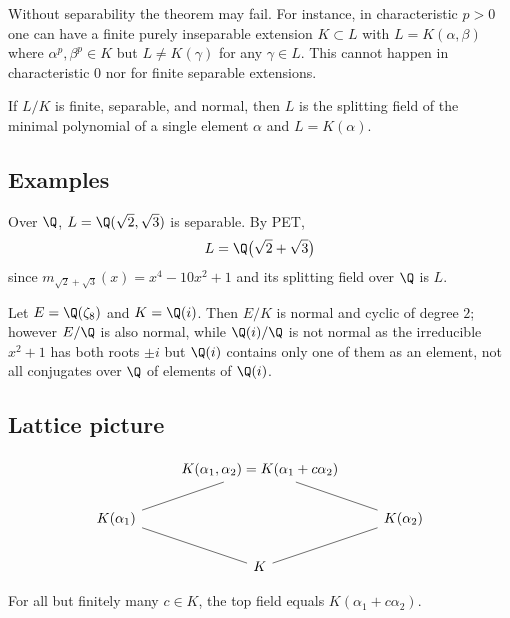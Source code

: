 \begin{remark}
Without separability the theorem may fail. For instance, in characteristic $p>0$ one can have a finite purely inseparable extension $K\subset L$ with $L=K(\alpha,\beta)$ where $\alpha^p,\beta^p\in K$ but $L\neq K(\gamma)$ for any $\gamma\in L$. This cannot happen in characteristic $0$ nor for finite separable extensions.
\end{remark}

\begin{corollary}
If $L/K$ is finite, separable, and normal, then $L$ is the splitting field of the minimal polynomial of a single element $\alpha$ and $L=K(\alpha)$.
\end{corollary}

\subsection{Examples}

\begin{example}
Over $\Q$, $L=\Q(\sqrt{2},\sqrt{3})$ is separable. By PET,
\[
L=\Q\big(\sqrt{2}+\sqrt{3}\big)
\]
since $m_{\sqrt{2}+\sqrt{3}}(x)=x^4-10x^2+1$ and its splitting field over $\Q$ is $L$.
\end{example}

\begin{example}
Let $E=\Q(\zeta_8)$ and $K=\Q(i)$. Then $E/K$ is normal and cyclic of degree $2$; however $E/\Q$ is also normal, while $\Q(i)/\Q$ is not normal as the irreducible $x^2+1$ has both roots $\pm i$ but $\Q(i)$ contains only one of them as an element, not all conjugates over $\Q$ of elements of $\Q(i)$.
\end{example}

\subsection{Lattice picture}
\[
\begin{tikzcd}
& K(\alpha_1,\alpha_2)=K(\alpha_1+c\alpha_2) \arrow[-]{dl} \arrow[-]{dr} & \\
K(\alpha_1) \arrow[-]{dr} & & K(\alpha_2) \arrow[-]{dl} \\
& K &
\end{tikzcd}
\]
\begin{remark}
For all but finitely many $c\in K$, the top field equals $K(\alpha_1+c\alpha_2)$.
\end{remark}
